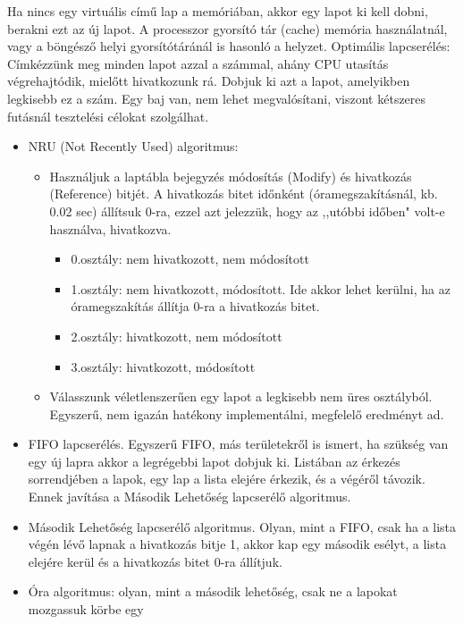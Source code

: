 \documentclass[margin=0px]{article}
\begin{document}
Ha nincs egy virtuális című lap a memóriában, akkor egy lapot ki kell dobni, berakni ezt az új lapot. A processzor gyorsító tár (cache) memória használatnál, vagy a böngésző helyi gyorsítótáránál is hasonló a helyzet.
Optimális lapcserélés: Címkézzünk meg minden lapot azzal a számmal, ahány CPU utasítás végrehajtódik, mielőtt hivatkozunk rá. Dobjuk ki azt a lapot, amelyikben legkisebb ez a szám. Egy baj van, nem lehet megvalósítani, viszont kétszeres futásnál tesztelési célokat szolgálhat.
\begin{itemize}
    \item NRU (Not Recently Used) algoritmus:
          \begin{itemize}
              \item Használjuk a laptábla bejegyzés módosítás (Modify) és hivatkozás (Reference) bitjét. A hivatkozás bitet időnként (óramegszakításnál, kb. 0.02 sec) állítsuk 0-ra, ezzel azt jelezzük, hogy az ,,utóbbi időben" volt-e használva, hivatkozva.
                    \begin{itemize}
                        \item 0.osztály: nem hivatkozott, nem módosított
                        \item 1.osztály: nem hivatkozott, módosított. Ide akkor lehet kerülni, ha az óramegszakítás állítja 0-ra a hivatkozás bitet.
                        \item 2.osztály: hivatkozott, nem módosított
                        \item 3.osztály: hivatkozott, módosított
                    \end{itemize}
              \item Válasszunk véletlenszerűen egy lapot a legkisebb nem üres osztályból. Egyszerű, nem igazán hatékony implementálni, megfelelő eredményt ad.
          \end{itemize}
    \item FIFO lapcserélés. Egyszerű FIFO, más területekről is ismert, ha szükség van egy új lapra akkor a legrégebbi lapot dobjuk ki. Listában az érkezés sorrendjében a lapok, egy lap a lista elejére érkezik, és a végéről távozik. Ennek javítása a Második Lehetőség lapcserélő algoritmus.
    \item Második Lehetőség lapcserélő algoritmus. Olyan, mint a FIFO, csak ha a lista végén lévő lapnak a hivatkozás bitje 1, akkor kap egy második esélyt, a lista elejére kerül és a hivatkozás bitet 0-ra állítjuk.
    \item Óra algoritmus: olyan, mint a második lehetőség, csak ne a lapokat mozgassuk körbe egy

\end{itemize}
\end{document}

